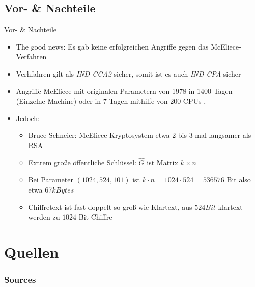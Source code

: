 \documentclass[11pt%
,aspectratio=169%
]{beamer}
\begin{document}
\subsection{Vor- \& Nachteile}
\begin{frame}{Vor- \& Nachteile}
    \begin{itemize}
        \item The good news: Es gab keine erfolgreichen Angriffe gegen das McEliece-Verfahren
        \item Verhfahren gilt als  \emph{IND-CCA2} \cite{dottling2012cca2} sicher, somit ist es auch \emph{IND-CPA} sicher \cite{nojima2008semantic}
        \item Angriffe McEliece mit originalen Parametern von 1978 in 1400 Tagen (Einzelne Machine) oder in 7 Tagen mithilfe von 200 CPUs \cite{baldi2016enhanced}, \cite{canteaut1998cryptanalysis}
        \item Jedoch:
        \begin{itemize}
            \item Bruce Schneier: McEliece-Kryptosystem etwa 2 bis 3 mal langsamer als RSA \cite[S. 479ff]{Schneier2007Applied}
            \item Extrem große öffentliche Schlüssel: $\hat{G}$ ist Matrix $k \times n$
            \item Bei Parameter $(1024,524,101)$ ist $k \cdot n = 1024 \cdot 524 = 536576$ Bit also etwa 67$kBytes$
            \item Chiffretext ist fast doppelt so groß wie Klartext, aus $524 Bit$ klartext werden zu $1024$ Bit Chiffre 
        \end{itemize}
     \end{itemize}
\end{frame}

\section{Quellen}
\appendix
\begin{frame}[allowframebreaks]
  \frametitle<presentation>{Sources}


\end{frame}
\end{document}
